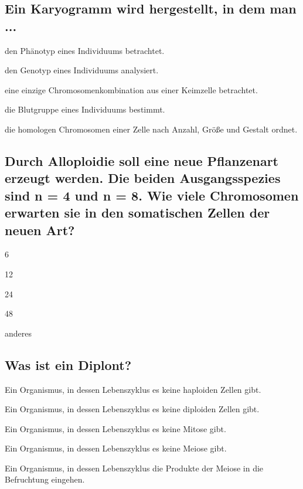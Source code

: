 \documentclass{article}
\begin{document}
\subsection*{Ein Karyogramm wird hergestellt, in dem man ...}
\begin{todolist}%
\item den Phänotyp eines Individuums betrachtet.  
\item den Genotyp eines Individuums analysiert.  
\item eine einzige Chromosomenkombination aus einer Keimzelle
betrachtet.  
\item die Blutgruppe eines Individuums bestimmt.  
\item die homologen Chromosomen einer Zelle nach Anzahl, Größe
und Gestalt ordnet.
\end{todolist}
\subsection*{Durch Alloploidie soll eine neue Pflanzenart erzeugt werden. Die beiden
Ausgangsspezies sind n = 4 und n = 8. Wie viele Chromosomen erwarten
sie in den somatischen Zellen der neuen Art?}
\begin{todolist}%
\item 6 
\item 12 
\item 24  
\item 48
\item anderes
\end{todolist}
\subsection*{Was ist ein Diplont?}
\begin{todolist}%
\item Ein Organismus, in dessen Lebenszyklus es keine haploiden Zellen
gibt.  
\item Ein Organismus, in dessen Lebenszyklus es keine diploiden Zellen
gibt.  
\item Ein Organismus, in dessen Lebenszyklus es keine Mitose gibt.  
\item Ein Organismus, in dessen Lebenszyklus es keine Meiose gibt.  
\item Ein Organismus, in dessen Lebenszyklus die Produkte der Meiose in
die Befruchtung eingehen.  
\end{todolist}
\end{document}
